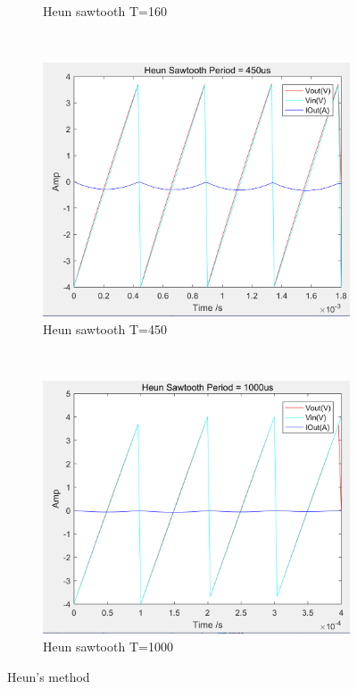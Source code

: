 \documentclass[a4paper, 12pt]{article}
\begin{document}
\begin{figure}[h]
\begin{subfigure}[b]{0.4\textwidth}
            \caption{Heun sawtooth T=160}
      \end{subfigure}
       ~
      \begin{subfigure}[b]{0.4\textwidth}
            \includegraphics[width=\textwidth]{ex1/heun_sawtooth_450PNG.PNG}
            \caption{Heun sawtooth T=450}
      \end{subfigure}
       ~
      \begin{subfigure}[b]{0.4\textwidth}
            \includegraphics[width=\textwidth]{ex1/heun_sawtooth_1000.PNG}
            \caption{Heun sawtooth T=1000}
      \end{subfigure}
      \caption{Heun's method}
\end{figure}
\end{document}
